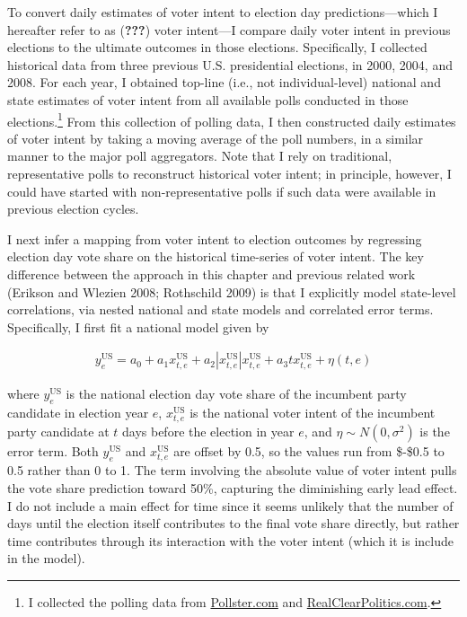 To convert daily estimates of voter intent to election day
predictions---which I hereafter refer to as ({\textbf{???}}) voter
intent---I compare daily voter intent in previous elections to the
ultimate outcomes in those elections. Specifically, I collected
historical data from three previous U.S. presidential elections, in
2000, 2004, and 2008. For each year, I obtained top-line (i.e., not
individual-level) national and state estimates of voter intent from all
available polls conducted in those elections.\footnote{I
collected the polling data from \url{Pollster.com} and
\url{RealClearPolitics.com}.} From this collection of polling data, I
then constructed daily estimates of voter intent by taking a moving
average of the poll numbers, in a similar manner to the major poll
aggregators. Note that I rely on traditional, representative polls to
reconstruct historical voter intent; in principle, however, I could have
started with non-representative polls if such data were available in
previous election cycles.

I next infer a mapping from voter intent to election outcomes by
regressing election day vote share on the historical time-series of
voter intent. The key difference between the approach in this chapter
and previous related work (Erikson and Wlezien 2008; Rothschild 2009) is
that I explicitly model state-level correlations, via nested national
and state models and correlated error terms. Specifically, I first fit a
national model given by

\begin{align*}
  y^{\text{US}}_{e}=a_0+a_1 x^{\text{US}}_{t,e}+
  a_2|x^{\text{US}}_{t,e}|x^{\text{US}}_{t,e} +
  a_3tx^{\text{US}}_{t,e} + \eta(t,e)
  \end{align*}

\noindent where \(y^{\text{US}}_{e}\) is the national election day vote
share of the incumbent party candidate in election year \(e\),
\(x^{\text{US}}_{t,e}\) is the national voter intent of the incumbent
party candidate at \(t\) days before the election in year \(e\), and
\(\eta \sim N(0,\sigma^2)\) is the error term. Both
\(y^{\text{US}}_{e}\) and \(x^{\text{US}}_{t,e}\) are offset by 0.5, so
the values run from \$-\$0.5 to 0.5 rather than 0 to 1. The term
involving the absolute value of voter intent pulls the vote share
prediction toward 50\%, capturing the diminishing early lead effect. I
do not include a main effect for time since it seems unlikely that the
number of days until the election itself contributes to the final vote
share directly, but rather time contributes through its interaction with
the voter intent (which it is include in the model).

